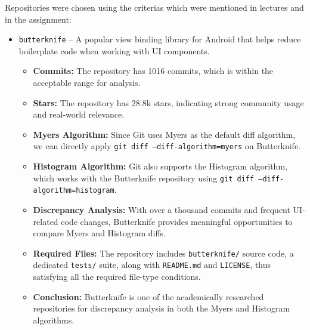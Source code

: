 \documentclass[12pt,a4paper]{article}
\begin{document}
Repositories were chosen using the criterias which were mentioned in lectures and in the assignment:
\begin{itemize}
    \item \texttt{butterknife} -- A popular view binding library for Android that helps reduce boilerplate code when working with UI components.  
        \begin{itemize}
            \item \textbf{Commits:} The repository has 1016 commits, which is within the acceptable range for analysis.
            \item \textbf{Stars:} The repository has 28.8k stars, indicating strong community usage and real-world relevance.  
            \item \textbf{Myers Algorithm:} Since Git uses Myers as the default diff algorithm, we can directly apply \texttt{git diff --diff-algorithm=myers} on Butterknife.  
            \item \textbf{Histogram Algorithm:} Git also supports the Histogram algorithm, which works with the Butterknife repository using \texttt{git diff --diff-algorithm=histogram}.  
            \item \textbf{Discrepancy Analysis:} With over a thousand commits and frequent UI-related code changes, Butterknife provides meaningful opportunities to compare Myers and Histogram diffs.  
            \item \textbf{Required Files:} The repository includes \texttt{butterknife/} source code, a dedicated \texttt{tests/} suite, along with \texttt{README.md} and \texttt{LICENSE}, thus satisfying all the required file-type conditions.  
            \item \textbf{Conclusion:} Butterknife is one of the academically researched repositories for discrepancy analysis in both the Myers and Histogram algorithms.
        \end{itemize}

\end{itemize}
\end{document}
